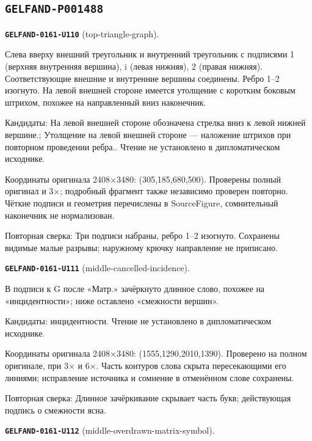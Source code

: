 \subsection*{\texttt{GELFAND-P001488}}
\par\noindent\leavevmode{}\label{GELFAND-0161-U110}\label{GELFAND-P001488:top-triangle-graph}\textbf{\texttt{GELFAND-0161-U110}} (top-triangle-graph).\nopagebreak[4]\par
Слева вверху внешний треугольник и внутренний треугольник с подписями 1 (верхняя внутренняя вершина), i (левая нижняя), 2 (правая нижняя). Соответствующие внешние и внутренние вершины соединены. Ребро 1–2 изогнуто. На левой внешней стороне имеется утолщение с коротким боковым штрихом, похожее на направленный вниз наконечник.\par
Кандидаты: На левой внешней стороне обозначена стрелка вниз к левой нижней вершине.; Утолщение на левой внешней стороне — наложение штрихов при повторном проведении ребра.. Чтение не установлено в дипломатическом исходнике.\par
Координаты оригинала 2408×3480: (305,185,680,500). Проверены полный оригинал и 3×; подробный фрагмент также независимо проверен повторно. Чёткие подписи и геометрия перечислены в SourceFigure, сомнительный наконечник не нормализован.\par
Повторная сверка: Три подписи набраны, ребро 1–2 изогнуто. Сохранены видимые малые разрывы; наружному крючку направление не приписано.\par\medskip
\par\noindent\leavevmode{}\label{GELFAND-0161-U111}\label{GELFAND-P001488:middle-cancelled-incidence}\textbf{\texttt{GELFAND-0161-U111}} (middle-cancelled-incidence).\nopagebreak[4]\par
В подписи к G после «Матр.» зачёркнуто длинное слово, похожее на «инцидентности»; ниже оставлено «смежности вершин».\par
Кандидаты: инцидентности. Чтение не установлено в дипломатическом исходнике.\par
Координаты оригинала 2408×3480: (1555,1290,2010,1390). Проверено на полном оригинале, при 3× и 6×. Часть контуров слова скрыта пересекающими его линиями; исправление источника и сомнение в отменённом слове сохранены.\par
Повторная сверка: Длинное зачёркивание скрывает часть букв; действующая подпись о смежности ясна.\par\medskip
\par\noindent\leavevmode{}\label{GELFAND-0161-U112}\label{GELFAND-P001488:middle-overdrawn-matrix-symbol}\textbf{\texttt{GELFAND-0161-U112}} (middle-overdrawn-matrix-symbol).\nopagebreak[4]\par
